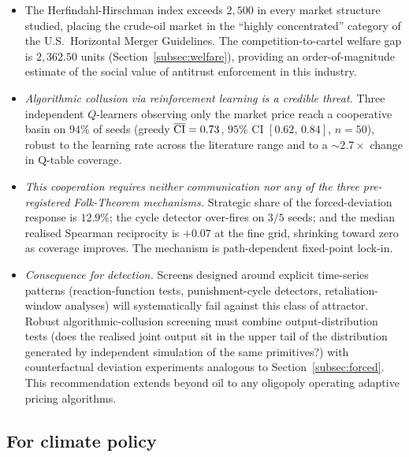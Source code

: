 \begin{itemize}\itemsep2pt

  \item The Herfindahl-Hirschman index exceeds $2{,}500$ in
        every market structure studied, placing the crude-oil
        market in the ``highly concentrated'' category of the
        U.S.\ Horizontal Merger Guidelines. The
        competition-to-cartel welfare gap is $2{,}362.50$ units
        (Section~\ref{subsec:welfare}), providing an order-of-magnitude estimate
        of the social value of antitrust enforcement in this
        industry.

  \item \emph{Algorithmic collusion via reinforcement learning
        is a credible threat.} Three independent $Q$-learners
        observing only the market price reach a cooperative
        basin on $94\%$ of seeds (greedy $\overline{\mathrm{CI}} = 0.73$, $95\%$
        CI $[0.62,\,0.84]$, $n = 50$), robust to the learning
        rate across the literature range and to a
        ${\sim}2.7\times$ change in Q-table coverage.

  \item \emph{This cooperation requires neither communication
        nor any of the three pre-registered Folk-Theorem
        mechanisms.} Strategic share of the forced-deviation
        response is $12.9\%$; the cycle detector over-fires on
        $3/5$ seeds; and the median realised Spearman
        reciprocity is $+0.07$ at the fine grid, shrinking
        toward zero as coverage improves. The mechanism is
        path-dependent fixed-point lock-in.

  \item \emph{Consequence for detection.} Screens designed
        around explicit time-series patterns (reaction-function
        tests, punishment-cycle detectors, retaliation-window
        analyses) will systematically fail against this class
        of attractor. Robust algorithmic-collusion screening
        must combine output-distribution tests (does the
        realised joint output sit in the upper tail of the
        distribution generated by independent simulation of the
        same primitives?) with counterfactual deviation
        experiments analogous to
        Section~\ref{subsec:forced}. This recommendation
        extends beyond oil to any oligopoly operating adaptive
        pricing algorithms.

\end{itemize}

\subsection*{For climate policy}

